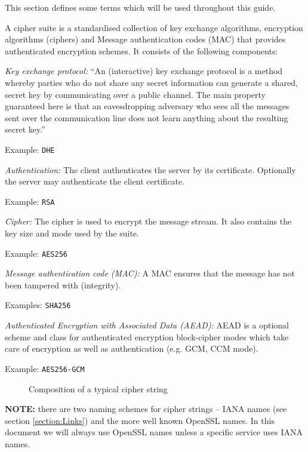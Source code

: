 
This section defines some terms which will be used throughout this guide.


A cipher suite is a standardised collection of key exchange algorithms, encryption 
algorithms (ciphers) and Message authentication codes (MAC) that provides authenticated 
encryption schemes. It consists of the following components:

\begin{description}

\item{\it Key exchange protocol:}
``An (interactive) key exchange protocol is a method whereby parties who do not 
share any secret information can generate a shared, secret key by communicating 
over a public channel. The main property guaranteed here is that an 
eavesdropping adversary who sees all the messages sent over the communication 
line does not learn anything about the resulting secret key.'' \cite{katz2008introduction}

Example: \texttt{DHE}

\item{\it Authentication:}
The client authenticates the server by its certificate. Optionally the server 
may authenticate the client certificate.

Example: \texttt{RSA}

\item{\it Cipher:}
The cipher is used to encrypt the message stream. It also contains the key size
and mode used by the suite.

Example: \texttt{AES256}

\item{\it Message authentication code (MAC):}
A MAC ensures that the message has not been tampered with (integrity).

Examples: \texttt{SHA256}

\item{\it Authenticated Encryption with Associated Data (AEAD):}
AEAD is a optional scheme and class for authenticated encryption block-cipher modes
which take care of encryption as well as authentication (e.g. GCM, CCM mode). 

Example: \texttt{AES256-GCM}



\begin{figure}[h]
\caption{Composition of a typical cipher string}
\end{figure}

\item {\textbf{NOTE:}} there are two naming schemes for cipher strings -- IANA names (see section \ref{section:Links}) and the more well known OpenSSL names. In this document we will always use OpenSSL names unless a specific service uses IANA names.

\end{description}
